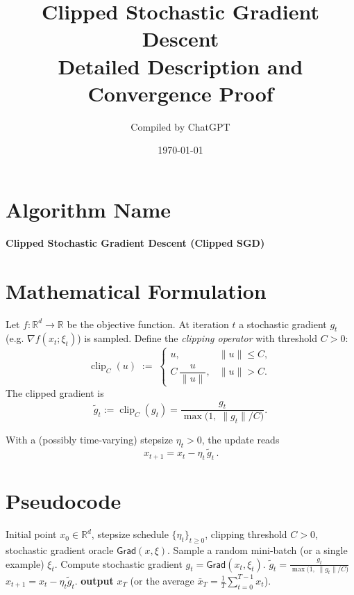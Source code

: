\documentclass{article}
\newcommand{\R}{\mathbb{R}}
\begin{document}
\title{Clipped Stochastic Gradient Descent \\ Detailed Description and Convergence Proof}
\author{Compiled by ChatGPT}
\date{\today}
\maketitle

\section*{Algorithm Name}
\textbf{Clipped Stochastic Gradient Descent (Clipped SGD)}

\section*{Mathematical Formulation}
Let $f:\R^{d}\rightarrow\R$ be the objective function.  
At iteration $t$ a stochastic gradient $g_{t}$ (e.g. $\nabla f(x_{t};\xi_{t})$) is sampled.
Define the \emph{clipping operator} with threshold $C>0$:
\[
\operatorname{clip}_{C}(u)\;:=\;
\begin{cases}
u, & \|u\|\le C,\\[4pt]
C\,\dfrac{u}{\|u\|}, & \|u\|>C .
\end{cases}
\]
The clipped gradient is
\[
\tilde g_{t}:=\operatorname{clip}_{C}(g_{t})
      =\frac{g_{t}}{\max\!\bigl(1,\;\|g_{t}\|/C\bigr)} .
\]

With a (possibly time‑varying) stepsize $\eta_{t}>0$, the update reads
\[
\boxed{\,x_{t+1}=x_{t}-\eta_{t}\,\tilde g_{t}\, } .
\]

\section*{Pseudocode}
\begin{algorithm}[H]
\caption{Clipped SGD}
\begin{algorithmic}[1]
\Require Initial point $x_{0}\in\R^{d}$, stepsize schedule $\{\eta_{t}\}_{t\ge0}$, clipping threshold $C>0$,
          stochastic gradient oracle $\mathsf{Grad}(x,\xi)$.
    \State Sample a random mini‑batch (or a single example) $\xi_{t}$.
    \State Compute stochastic gradient $g_{t}= \mathsf{Grad}(x_{t},\xi_{t})$.
    \State $\displaystyle \tilde g_{t}= \frac{g_{t}}
                {\max\bigl(1,\;\|g_{t}\|/C\bigr)}$ 
    \State $x_{t+1}=x_{t}-\eta_{t}\tilde g_{t}$.
\EndFor
\State \textbf{output} $x_{T}$ (or the average $\bar x_{T}=\frac1T\sum_{t=0}^{T-1}x_{t}$).
\end{algorithmic}
\end{algorithm}
\end{document}
